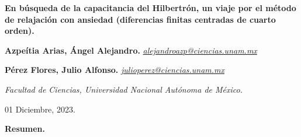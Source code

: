 \documentclass[a4paper,11pt]{extarticle} %
\newcommand{\ut}
[1]{\textbf{#1}} %
\begin{document}
\begin{center}


	\large{\textbf{En búsqueda de la capacitancia del Hilbertrón, un viaje por el método de relajación con ansiedad (diferencias finitas
			centradas de cuarto orden).}}

	\vspace{-\baselineskip}

	\vspace{0.45em}

	\begin{multicols}{2}
		\begin{center}
			\small{\noindent \textbf {Azpeítia Arias, Ángel Alejandro.}\linebreak
				\noindent \textit{\href{mailto:alejandroazp@ciencias.unam.mx}{alejandroazp@ciencias.unam.mx}}}

		\end{center}
		\columnbreak
		\begin{center}
			\small{\noindent \textbf{ Pérez Flores, Julio Alfonso.}\linebreak
				\noindent \textit{\href{mailto:julio_ perez@ciencias.unam.mx}{julio\textunderscore perez@ciencias.unam.mx}}}

		\end{center}
	\end{multicols}

	\vspace{-\baselineskip}
	\vspace{0.35em}

	\textit{\small{Facultad de Ciencias, Universidad Nacional Autónoma de México. }}

	\small{01 Diciembre, 2023.}

\end{center}

{\noindent \Large\ut{Resumen.}}
\end{document}
